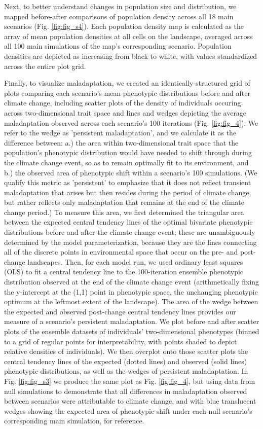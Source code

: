\documentclass[9pt,twocolumn,twoside,lineno]{pnas-new}
\begin{document}
{Next, to better understand changes in population size and distribution,
we mapped before-after comparisons of population density across all 18
main scenarios (Fig. \ref{fig:fig_s4}).
Each population density map is calculated as
the array of mean population densities at all cells on the landscape,
averaged across all 100 main simulations of the map's corresponding scenario.
Population densities are depicted as increasing from black to white, with
values standardized across the entire plot grid.

Finally, to visualize maladaptation, we created an identically-structured
grid of plots comparing each scenario's
mean phenotypic distributions before and after climate change,
including scatter plots of the density of individuals occuring across
two-dimensional trait space and lines and wedges depicting the average maladaptation
observed across each scenario's 100 iterations (Fig. \ref{fig:fig_4}).
We refer to the wedge as 'persistent maladaptation',
and we calculate it as the difference between: a.) the area 
within two-dimensional trait space that the population’s phenotypic distribution 
would have needed to shift through during the climate change event, so as to remain 
optimally fit to its environment, and b.) the observed area of phenotypic shift within
a scenario's 100 simulations.
(We qualify this metric as 'persistent' to emphasize that it does
not reflect transient maladaptation that arises but then
resides during the period of climate change, but rather reflects
only maladaptation that remains at the end of the climate change period.)
To measure this area, we first determined the triangular area between 
the expected central tendency lines of the optimal bivariate phenotypic distributions
before and after the climate change event;
these are unambiguously determined by the model parameterization, because
they are the lines connecting all of the discrete 
points in environmental space that occur on the pre- and post-change landscapes.
Then, for each model run, we used ordinary least squares (OLS)
to fit a central tendency line to the 100-iteration ensemble phenotypic distribution
observed at the end of the climate change event
(arithmetically fixing the y-intercept at the (1,1) point in phenotypic 
space, the unchanging phenotypic optimum at the leftmost extent of the landscape).
The area of the wedge between the expected and observed post-change central tendency
lines provides our measure of a scenario's persistent maladaptation.
We plot before and after scatter plots of the ensemble datasets
of individuals' two-dimensional phenotypes
(binned to a grid of regular points for interpretability, with points
shaded to depict relative densities of individuals).
We then overplot onto those scatter plots the central tendency lines of
the expected (dotted lines) and observed (solid lines) phenotypic distributions,
as well as the wedges of persistent maladaptation.
In Fig. \ref{fig:fig_s3} we produce the same plot as Fig. \ref{fig:fig_4},
but using data from null simulations to demonstrate that all differences
in maladaptation observed between scenarios were attributable to climate change,
and with blue translucent wedges showing the expected area of phenotypic shift
under each null scenario's corresponding main simulation, for reference.

}
\end{document}
